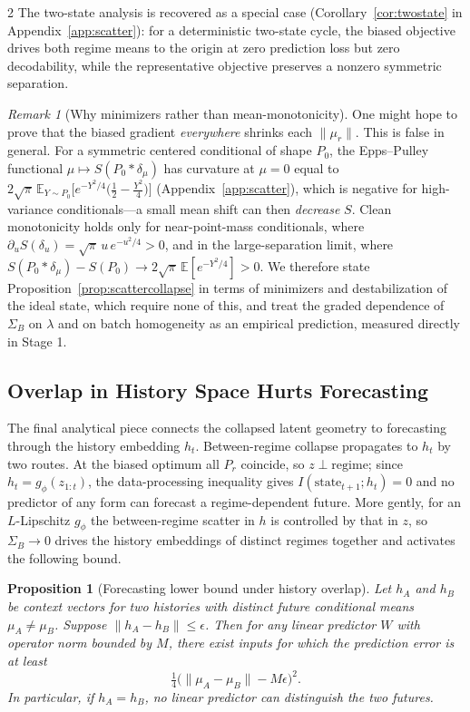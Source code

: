 \documentclass[10pt]{article}
\newtheorem{proposition}{Proposition}
\theoremstyle{remark}
\newtheorem{remark}{Remark}
\begin{document}
\begin{multicols*}{2}
The two-state analysis is recovered as a special case (Corollary~\ref{cor:twostate} in Appendix~\ref{app:scatter}): for a deterministic two-state cycle, the biased objective drives both regime means to the origin at zero prediction loss but zero decodability, while the representative objective preserves a nonzero symmetric separation.

\begin{remark}[Why minimizers rather than mean-monotonicity]
One might hope to prove that the biased gradient \emph{everywhere} shrinks each $\|\mu_r\|$. This is false in general. For a symmetric centered conditional of shape $P_0$, the Epps--Pulley functional $\mu \mapsto S(P_0 * \delta_\mu)$ has curvature at $\mu = 0$ equal to $2\sqrt{\pi}\,\mathbb{E}_{Y \sim P_0}\bigl[e^{-Y^2/4}\bigl(\tfrac12 - \tfrac{Y^2}{4}\bigr)\bigr]$ (Appendix~\ref{app:scatter}), which is negative for high-variance conditionals---a small mean shift can then \emph{decrease} $S$. Clean monotonicity holds only for near-point-mass conditionals, where $\partial_u S(\delta_u) = \sqrt{\pi}\, u\, e^{-u^2/4} > 0$, and in the large-separation limit, where $S(P_0 * \delta_\mu) - S(P_0) \to 2\sqrt{\pi}\,\mathbb{E}[e^{-Y^2/4}] > 0$. We therefore state Proposition~\ref{prop:scattercollapse} in terms of minimizers and destabilization of the ideal state, which require none of this, and treat the graded dependence of $\Sigma_B$ on $\lambda$ and on batch homogeneity as an empirical prediction, measured directly in Stage 1.
\end{remark}

\subsection{Overlap in History Space Hurts Forecasting}
\label{sec:forecast}

The final analytical piece connects the collapsed latent geometry to forecasting through the history embedding $h_t$. Between-regime collapse propagates to $h_t$ by two routes. At the biased optimum all $P_r$ coincide, so $z \perp \mathrm{regime}$; since $h_t = g_\phi(z_{1:t})$, the data-processing inequality gives $I(\mathrm{state}_{t+1}; h_t) = 0$ and no predictor of any form can forecast a regime-dependent future. More gently, for an $L$-Lipschitz $g_\phi$ the between-regime scatter in $h$ is controlled by that in $z$, so $\Sigma_B \to 0$ drives the history embeddings of distinct regimes together and activates the following bound.

\begin{proposition}[Forecasting lower bound under history overlap]
\label{prop:hbound}
Let $h_A$ and $h_B$ be context vectors for two histories with distinct future conditional means $\mu_A \neq \mu_B$. Suppose $\|h_A - h_B\| \le \epsilon$. Then for any linear predictor $W$ with operator norm bounded by $M$, there exist inputs for which the prediction error is at least
\[
\tfrac14\bigl(\|\mu_A - \mu_B\| - M\epsilon\bigr)^2 .
\]
In particular, if $h_A = h_B$, no linear predictor can distinguish the two futures.
\end{proposition}


\end{multicols*}
\end{document}

